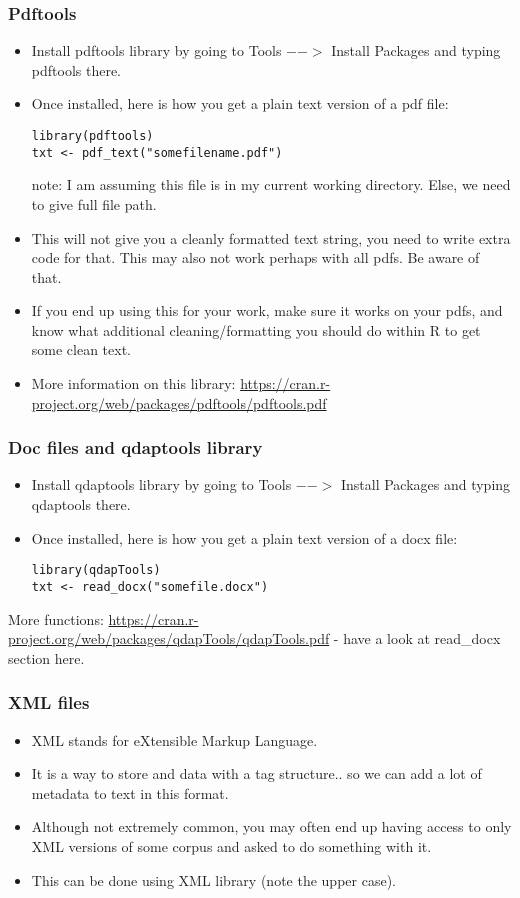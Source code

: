 \documentclass{beamer}
\begin{document}
\begin{frame}[fragile]
\frametitle{Pdftools} 
\begin{itemize}
\item Install pdftools library by going to Tools $-->$ Install Packages and typing pdftools there.
\item Once installed, here is how you get a plain text version of a pdf file:
\begin{verbatim}
library(pdftools)
txt <- pdf_text("somefilename.pdf") 
\end{verbatim}
note: I am assuming this file is in my current working directory.  Else, we need to give full file path.
\pause \item This will not give you a cleanly formatted text string, you need to write extra code for that. This may also not work perhaps with all pdfs. Be aware of that.
\item If you end up using this for your work, make sure it works on your pdfs, and know what additional cleaning/formatting you should do within R to get some clean text.
\item More information on this library: \url{https://cran.r-project.org/web/packages/pdftools/pdftools.pdf} 
\end{itemize}
\end{frame}

\begin{frame}[fragile]
\frametitle{Doc files and qdaptools library}
\begin{itemize}
\item Install qdaptools library by going to Tools $-->$ Install Packages and typing qdaptools there.
\item Once installed, here is how you get a plain text version of a docx file:
\begin{verbatim}
library(qdapTools)
txt <- read_docx("somefile.docx")
\end{verbatim}
\end{itemize}
More functions: \url{https://cran.r-project.org/web/packages/qdapTools/qdapTools.pdf} - have a look at read\_docx section here. 
\end{frame}

\begin{frame}
\frametitle{XML files}
\begin{itemize}
\item XML stands for eXtensible Markup Language. 
\item It is a way to store and data with a tag structure.. so we can add a lot of metadata to text in this format. 
\item Although not extremely common, you may often end up having access to only XML versions of some corpus and asked to do something with it.
\item This can be done using XML library (note the upper case).
\end{itemize}
\end{frame}
\end{document}
